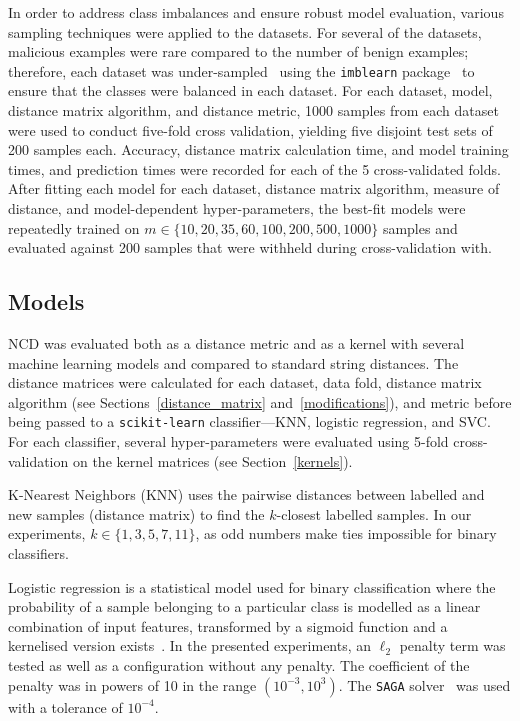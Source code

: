\documentclass[preprint,12pt]{article}
\begin{document}
In order to address class imbalances and ensure robust model evaluation, various sampling techniques were applied to the datasets. 
For several of the datasets, malicious examples were rare compared to the number of benign examples; therefore, each dataset was under-sampled~\cite{undersampling} using the \texttt{imblearn} package~\cite{imblearn} to ensure that the classes were balanced in each dataset. 
For each dataset, model, distance matrix algorithm, and distance metric, 1000 samples from each dataset were used to conduct five-fold cross validation, yielding five disjoint test sets of 200 samples each. 
Accuracy, distance matrix calculation time, and model training times, and prediction times were recorded for each of the 5 cross-validated folds.
After fitting each model for each dataset, distance matrix algorithm, measure of distance, and model-dependent hyper-parameters, the best-fit models were repeatedly trained on $m \in \{ 10, 20, 35, 60, 100, 200, 500, 1000\}$ samples and evaluated against 200 samples that were withheld during cross-validation with.



\subsection{Models}
\label{models}
NCD was evaluated both as a distance metric and as a kernel with several machine learning models and compared to standard string distances.
The distance matrices were calculated for each dataset, data fold, distance matrix algorithm (see Sections~\ref{distance_matrix} and~\ref{modifications}), and metric before being passed to a \texttt{scikit-learn} classifier---KNN, logistic regression, and SVC.
For each classifier, several hyper-parameters were evaluated using 5-fold cross-validation on the kernel matrices (see Section~\ref{kernels}).

K-Nearest Neighbors (KNN) uses the pairwise distances between labelled and new samples (distance matrix) to find the $k$-closest labelled samples.
In our experiments, $k 
\in \{1,3,5,7,11\}$, as odd numbers make ties impossible for binary classifiers.

Logistic regression is a statistical model used for binary classification where the probability of a sample belonging to a particular class is modelled as a linear combination of input features, transformed by a sigmoid function and a kernelised version exists~\cite{maalouf2011robust}.
In the presented experiments, an $\ell_2$ penalty term was tested as well as a configuration without any penalty. 
The coefficient of the penalty was in powers of 10 in the range $(10^{-3}, 10^3)$.
The \texttt{SAGA} solver~\cite{saga} was used with a tolerance of $10^{-4}$.
\end{document}
